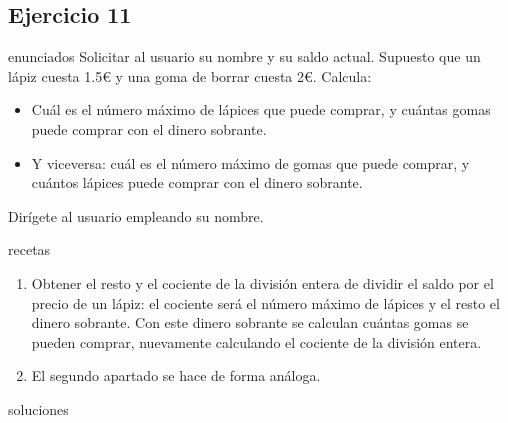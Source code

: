 \subsection{Ejercicio 11}
\def\parte{enunciados}
\ifx\capitulo\parte
Solicitar al usuario su nombre y su saldo actual. Supuesto que un lápiz cuesta 1.5€ y una goma de borrar cuesta 2€. Calcula:
\begin{itemize}
\item Cuál es el número máximo de lápices que puede comprar, y cuántas gomas puede comprar con el dinero sobrante.
\item Y viceversa: cuál es el número máximo de gomas que puede comprar, y cuántos lápices puede comprar con el dinero sobrante.
\end{itemize}
Dirígete al usuario empleando su nombre.
\fi

\def\parte{recetas}
\ifx\capitulo\parte
\begin{enumerate}
\item Obtener el resto y el cociente de la división entera de dividir el saldo por el precio de un lápiz: el cociente será el número máximo de lápices y el resto el dinero sobrante. Con este dinero sobrante se calculan cuántas gomas se pueden comprar, nuevamente calculando el cociente de la división entera.
\item El segundo apartado se hace de forma análoga.
\end{enumerate}
\fi

\def\parte{soluciones}
\ifx\capitulo\parte

\fi
